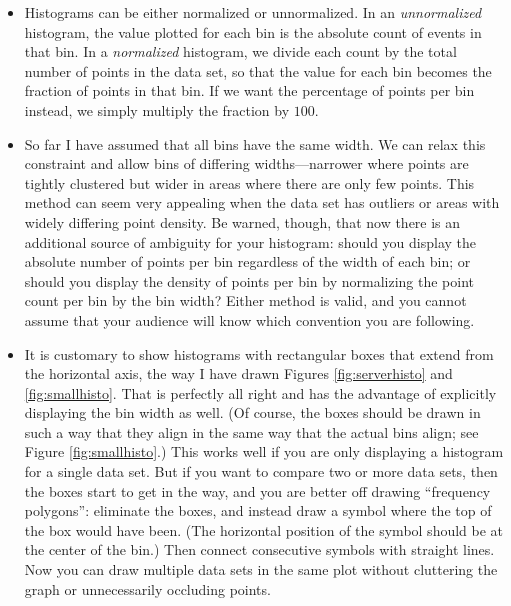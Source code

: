 \begin{itemize}
\item Histograms can be either normalized or unnormalized.  In an
  \emph{unnormalized} histogram, the value plotted for each bin is the
  absolute count of events in that bin. In a \emph{normalized}
  histogram, we divide each count by the total number of points in the
  data set, so that the value for each bin becomes the fraction of
  points in that bin. If we want the percentage of points per bin
  instead, we simply multiply the fraction by $100$.

\item So far I have assumed that all bins have the same width.  We can
  relax this constraint and allow bins of differing widths---narrower
  where points are tightly clustered but wider in areas where there
  are only few points. This method can seem very appealing when the
  data set has outliers or areas with widely differing point density.
  Be warned, though, that now there is an additional source of
  ambiguity for your histogram: should you display the absolute number
  of points per bin regardless of the width of each bin; or should you
  display the density of points per bin by normalizing the point count
  per bin by the bin width?  Either method is valid, and you cannot
  assume that your audience will know which convention you are
  following.\pagebreak

\item It is customary to show histograms with rectangular boxes that
  extend from the horizontal axis, the way I have drawn Figures
  \ref{fig:serverhisto} and \ref{fig:smallhisto}.  That is perfectly
  all right and has the advantage of explicitly displaying the bin
  width as well. (Of course, the boxes should be drawn in such a way
  that they align in the same way that the actual bins align; see
  Figure \ref{fig:smallhisto}.) This works well if you are only
  displaying a histogram for a single data set. But if you want to
  compare two or more data sets, then the boxes start to get in the
  way, and you are better off drawing ``frequency polygons'': eliminate
  the boxes, and instead draw a symbol where the top of the box would
  have been.  (The horizontal position of the symbol should be at the
  center of the bin.) Then connect consecutive symbols with straight
  lines.  Now you can draw multiple data sets in the same plot
  without cluttering the graph or unnecessarily occluding points.


\end{itemize}

